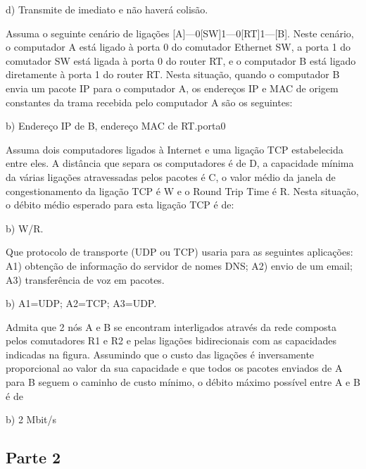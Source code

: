 \documentclass[addpoints]{exam}
\begin{document}
\begin{questions}
d) Transmite de imediato e não haverá colisão.

\question Assuma o seguinte cenário de ligações [A]—0[SW]1—0[RT]1—[B]. Neste cenário, o computador A está ligado
à porta 0 do comutador Ethernet SW, a porta 1 do comutador SW está ligada à porta 0 do router RT, e o computador
B está ligado diretamente à porta 1 do router RT. Nesta situação, quando o computador B envia um pacote IP para
o computador A, os endereços IP e MAC de origem constantes da trama recebida pelo computador A são os
seguintes:

b) Endereço IP de B, endereço MAC de RT.porta0

\question Assuma dois computadores ligados à Internet e uma ligação TCP estabelecida entre eles. A distância que separa os
computadores é de D, a capacidade mínima da várias ligações atravessadas pelos pacotes é C, o valor médio da
janela de congestionamento da ligação TCP é W e o Round Trip Time é R. Nesta situação, o débito médio esperado
para esta ligação TCP é de: 

b) W/R.

\question Que protocolo de transporte (UDP ou TCP) usaria para as seguintes aplicações: A1) obtenção de informação do
servidor de nomes DNS; A2) envio de um email; A3) transferência de voz em pacotes. 

b) A1=UDP; A2=TCP; A3=UDP.

\question Admita que 2 nós A e B se encontram interligados através da rede composta pelos comutadores R1 e R2 e pelas
ligações bidirecionais com as capacidades indicadas na figura. Assumindo que o custo das ligações é inversamente
proporcional ao valor da sua capacidade e que todos os pacotes enviados de A para B seguem o caminho de custo
mínimo, o débito máximo possível entre A e B é de

b) 2 Mbit/s

\end{questions}

\subsection*{Parte 2}
\end{document}
